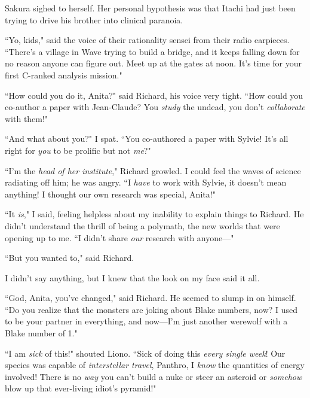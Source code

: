 Sakura sighed to herself. Her personal hypothesis was that Itachi had just been trying to drive his brother into clinical paranoia.

``Yo, kids," said the voice of their rationality sensei from their radio earpieces. ``There's a village in Wave trying to build a bridge, and it keeps falling down for no reason anyone can figure out. Meet up at the gates at noon. It's time for your first C-ranked analysis mission."

\clearpage
{}

``How could you do it, Anita?" said Richard, his voice very tight. ``How could you co-author a paper with Jean-Claude? You \emph{study} the undead, you don't \emph{collaborate} with them!"

``And what about you?" I spat. ``You co-authored a paper with Sylvie! It's all right for \emph{you} to be prolific but not \emph{me}?"

``I'm the \emph{head of her institute}," Richard growled. I could feel the waves of science radiating off him; he was angry. ``I \emph{have} to work with Sylvie, it doesn't mean anything! I thought our own research was special, Anita!"

``It \emph{is}," I said, feeling helpless about my inability to explain things to Richard. He didn't understand the thrill of being a polymath, the new worlds that were opening up to me. ``I didn't share \emph{our} research with anyone—"

``But you wanted to," said Richard.

I didn't say anything, but I knew that the look on my face said it all.

``God, Anita, you've changed," said Richard. He seemed to slump in on himself. ``Do you realize that the monsters are joking about Blake numbers, now? I used to be your partner in everything, and now—I'm just another werewolf with a Blake number of 1."


``I am \emph{sick} of this!" shouted Liono. ``Sick of doing this \emph{every single week}! Our species was capable of \emph{interstellar travel}, Panthro, I \emph{know} the quantities of energy involved! There is no \emph{way} you can't build a nuke or steer an asteroid or \emph{somehow} blow up that ever-living idiot's pyramid!"

\clearpage
{}


